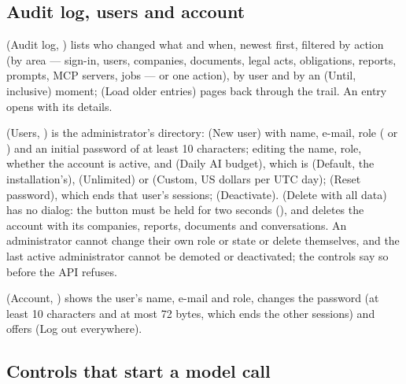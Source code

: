 \subsection{Audit log, users and account}\label{sec:console:admin}

 (Audit log, ) lists who changed what and when,
newest first, filtered by action (by area --- sign-in, users, companies, documents, legal acts,
obligations, reports, prompts, MCP servers, jobs --- or one action), by user and by an
 (Until, inclusive) moment;  (Load older entries) pages back
through the trail. An entry opens with its details.

 (Users, ) is the administrator's directory:
 (New user) with name, e-mail, role ( or
) and an initial password of at least 10 characters; editing the name, role,
whether the account is active, and  (Daily AI budget), which is
 (Default, the installation's),  (Unlimited) or 
(Custom, US dollars per UTC day);  (Reset password), which ends that user's
sessions;  (Deactivate).  (Delete with all data)
has no dialog: the button must be held for two seconds (), and
deletes the account with its companies, reports, documents and conversations. An administrator
cannot change their own role or state or delete themselves, and the last active administrator
cannot be demoted or deactivated; the controls say so before the API refuses.

 (Account, ) shows the user's name, e-mail and role,
changes the password (at least 10 characters and at most 72 bytes, which ends the other sessions)
and offers  (Log out everywhere).

\subsection{Controls that start a model call}\label{sec:console:modelbuttons}

